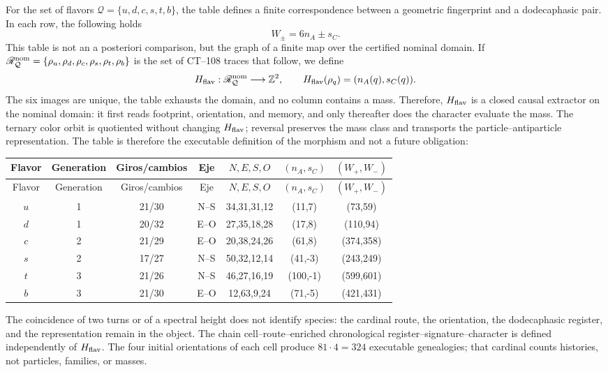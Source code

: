 For the set of flavors
\(\mathcal Q=\{u,d,c,s,t,b\}\), the table defines a finite correspondence
between a geometric fingerprint and a dodecaphasic pair. In each row, the following holds
\[
 W_\pm=6n_A\pm s_C.
\]
This table is not an a posteriori comparison, but the graph of a
finite map over the certified nominal domain. If
\(\mathscr R_{\mathcal Q}^{\rm nom}=\{\rho_u,\rho_d,\rho_c,\rho_s,\rho_t,\rho_b\}\)
is the set of CT--108 traces that follow, we define
\[
 H_{\rm flav}:\mathscr R_{\mathcal Q}^{\rm nom}\longrightarrow\mathbb Z^2,
 \qquad H_{\rm flav}(\rho_q)=(n_A(q),s_C(q)).
\]
The six images are unique, the table exhausts the domain, and no column
contains a mass. Therefore, \(H_{\rm flav}\) is a closed causal extractor on
the nominal domain: it first reads footprint, orientation, and memory, and only thereafter
does the character evaluate the mass. The ternary color orbit is quotiented without changing
\(H_{\rm flav}\); reversal preserves the mass class and transports the
particle--antiparticle representation. The table is therefore the executable definition
of the morphism and not a future obligation:

\begin{longtable}{c c c c c c c}
\toprule
Flavor & Generation & Giros/cambios & Eje & \(N,E,S,O\)
& \((n_A,s_C)\) & \((W_+,W_-)\)\\
\midrule
\endfirsthead
\toprule
Flavor & Generation & Giros/cambios & Eje & \(N,E,S,O\)
& \((n_A,s_C)\) & \((W_+,W_-)\)\\
\midrule
\endhead
\(u\)&1&21/30&N--S&34,31,31,12&(11,7)&(73,59)\\
\(d\)&1&20/32&E--O&27,35,18,28&(17,8)&(110,94)\\
\(c\)&2&21/29&E--O&20,38,24,26&(61,8)&(374,358)\\
\(s\)&2&17/27&N--S&50,32,12,14&(41,-3)&(243,249)\\
\(t\)&3&21/26&N--S&46,27,16,19&(100,-1)&(599,601)\\
\(b\)&3&21/30&E--O&12,63,9,24&(71,-5)&(421,431)\\
\bottomrule
\end{longtable}

The coincidence of two turns or of a spectral height does not identify
species: the cardinal route, the orientation, the dodecaphasic register, and the
representation remain in the object. The chain
cell--route--enriched chronological register--signature--character is defined
independently of \(H_{\rm flav}\). The
four initial orientations of each cell produce
\(81\cdot4=324\) executable genealogies; that cardinal counts histories, not
particles, families, or masses.

